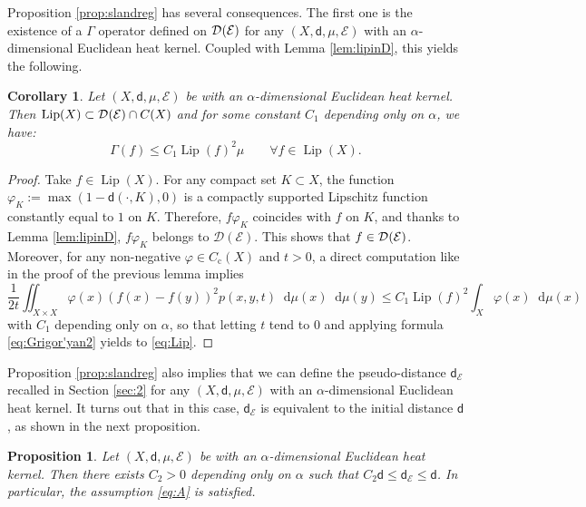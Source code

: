 \documentclass[10pt]{amsart}
\newcommand{\rmc}{\mathrm{c}}
\newcommand{\NoChangel}[1]{%
\expandafter\let\csname old\string#1\endcsname=#1
\let#1=\relax
\newcommand{#1}{\mathcode`l="716C\csname old\string#1\endcsname\mathcode`l="7160 }%
}
\theoremstyle{plain}
\newtheorem{proposition}[theorem]{Proposition}
\newtheorem{corollary}[theorem]{Corollary}
\theoremstyle{definition}
\newcommand{\cE}{\mathcal{E}}
\newcommand{\cD}{\mathcal{D}}
\let\phi\varphi
\newcommand{\di}{\mathop{}\!\mathrm{d}}
\newcommand{\loc}{\mathrm{loc}}\NoChangel{\loc}
\DeclareMathOperator{\Lip}{Lip}
\newcommand{\dist}{\mathsf{d}}
\begin{document}
Proposition \ref{prop:slandreg} has several consequences. The first one is the existence of a $\Gamma$ operator defined on $\cD_{\loc}(\cE)$ for any $(X,\dist,\mu,\cE)$ with an $\alpha$-dimensional Euclidean heat kernel. Coupled with Lemma \ref{lem:lipinD}, this yields the following.

\begin{corollary}\label{cor:1}
Let $(X,\dist,\mu,\cE)$ be with an $\alpha$-dimensional Euclidean heat kernel. Then $\Lip(X) \subset \cD_{\loc}(\cE)\cap C(X)$ and for some constant $C_1$ depending only on $\alpha$, we have:
\begin{equation}\label{eq:Lip}
\Gamma(f) \le C_1 \Lip(f)^2 \mu \qquad \forall f \in \Lip(X).
\end{equation}
\end{corollary}

\begin{proof}
Take $f \in \Lip(X)$. For any compact set $K \subset X$, the function $\phi_K:=\max(1-\dist(\cdot,K),0)$ is a compactly supported Lipschitz function constantly equal to $1$ on $K$. Therefore, $f \phi_K$ coincides with $f$ on $K$, and thanks to Lemma \ref{lem:lipinD}, $f \phi_K$ belongs to $\cD(\cE)$. This shows that $f \in \cD_{\loc}(\cE)$. Moreover, for any non-negative $\phi \in C_\rmc(X)$ and $t>0$, a direct computation like in the proof of the previous lemma implies
\[
\frac{1}{2t} \iint_{X\times X} \phi(x)(f(x)-f(y))^2 p(x,y,t) \di \mu(x) \di \mu(y) \le C_1 \Lip(f)^2 \int_X \phi(x) \di \mu(x)
\]
with $C_1$ depending only on $\alpha$, so that letting $t$ tend to $0$ and applying formula \eqref{eq:Grigor'yan2} yields to \eqref{eq:Lip}.
\end{proof}

Proposition \ref{prop:slandreg} also implies that we can define the pseudo-distance $\dist_\cE$ recalled in Section \ref{sec:2} for any $(X,\dist,\mu,\cE)$ with an $\alpha$-dimensional Euclidean heat kernel. It turns out that in this case, $\dist_\cE$ is equivalent to the initial distance $\dist$, as shown in the next proposition.

\begin{proposition}\label{eq:propA}
Let $(X,\dist,\mu,\cE)$ be with an $\alpha$-dimensional Euclidean heat kernel. Then there exists $C_2>0$ depending only on $\alpha$ such that $C_2 \dist \le \dist_{\cE} \le \dist$. In particular, the assumption \eqref{eq:A} is satisfied.
\end{proposition}
\end{document}

